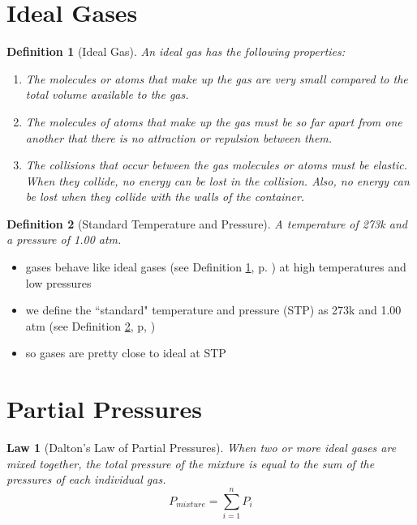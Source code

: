\documentclass[11pt, oneside]{article}   	%
\newtheorem{definition}{Definition}
\newtheorem{law}{Law}
\begin{document}
\section{Ideal Gases}

\begin{definition}[Ideal Gas]\label{def:ideal-gas}
An ideal gas has the following properties:\\
\begin{enumerate}
\item The molecules or atoms that make up the gas are very small compared to the total volume available to the gas.
\item The molecules of atoms that make up the gas must be so far apart from one another that there is no attraction or repulsion between them.
\item The collisions that occur between the gas molecules or atoms must be elastic. When they collide, no energy can be lost in the collision.
Also, no energy can be lost when they collide with the walls of the container.
\end{enumerate}
\end{definition}

\begin{definition}[Standard Temperature and Pressure]\label{defn:stp}
A temperature of 273k and a pressure of 1.00 atm.
\end{definition}

\begin{itemize}
\item gases behave like ideal gases (see Definition \ref{def:ideal-gas}, p. \pageref{def:ideal-gas}) at high temperatures and low pressures
\item we define the ``standard" temperature and pressure (STP) as 273k and 1.00 atm (see Definition \ref{defn:stp}, p, \pageref{defn:stp})
\item so gases are pretty close to ideal at STP
\end{itemize}

\section{Partial Pressures}

\begin{law}[Dalton's Law of Partial Pressures]\label{law:dalton:partial-pressures}
When two or more ideal gases are mixed together, the total pressure of the mixture is equal to the sum of the pressures of each individual gas.\\
$$P_{mixture} = \sum^{n}_{i=1} P_{i} $$
\end{law}
\end{document}
